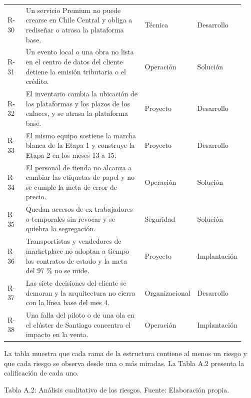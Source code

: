 \documentclass[11pt]{article}
\begin{document}
\begin{longtable}{p{0.080\linewidth}p{0.540\linewidth}p{0.160\linewidth}p{0.160\linewidth}}
R-30 & Un servicio Premium no puede crearse en Chile Central y obliga a rediseñar o atrasa la plataforma base. & Técnica & Desarrollo \\
R-31 & Un evento local o una obra no lista en el centro de datos del cliente detiene la emisión tributaria o el crédito. & Operación & Solución \\
R-32 & El inventario cambia la ubicación de las plataformas y los plazos de los enlaces, y se atrasa la plataforma base. & Proyecto & Desarrollo \\
R-33 & El mismo equipo sostiene la marcha blanca de la Etapa 1 y construye la Etapa 2 en los meses 13 a 15. & Proyecto & Desarrollo \\
R-34 & El personal de tienda no alcanza a cambiar las etiquetas de papel y no se cumple la meta de error de precio. & Operación & Solución \\
R-35 & Quedan accesos de ex trabajadores o temporales sin revocar y se quiebra la segregación. & Seguridad & Solución \\
R-36 & Transportistas y vendedores de marketplace no adoptan a tiempo los contratos de estado y la meta del 97 \% no se mide. & Proyecto & Implantación \\
R-37 & Las siete decisiones del cliente se demoran y la arquitectura no cierra con la línea base del mes 4. & Organizacional & Desarrollo \\
R-38 & Una falla del piloto o de una ola en el clúster de Santiago concentra el impacto en la venta. & Operación & Implantación \\
\end{longtable}

La tabla muestra que cada rama de la estructura contiene al menos un riesgo y que cada riesgo se observa desde una o más miradas. La Tabla A.2 presenta la calificación de cada uno.

Tabla A.2: Análisis cualitativo de los riesgos. Fuente: Elaboración propia.
\end{document}
